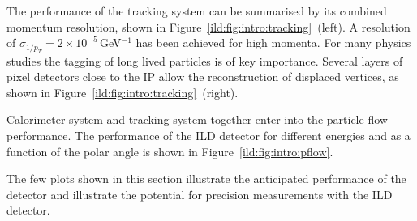The performance of the tracking system can be summarised by its combined momentum resolution, shown in Figure~\ref{ild:fig:intro:tracking}~(left). A resolution of $\sigma_{1/p_T} = 2 \times 10^{-5}$\,GeV$^{-1}$ has been achieved for high momenta. For many physics studies the tagging of long lived particles is of key importance. Several layers of pixel detectors close to the IP allow the reconstruction of displaced vertices, as shown in Figure~\ref{ild:fig:intro:tracking}~(right).




Calorimeter system and tracking system together enter into the particle flow performance. The performance of the ILD detector for different energies and as a function of the polar angle is shown in Figure~\ref{ild:fig:intro:pflow}. 

The few plots shown in this section illustrate the anticipated performance of the detector and illustrate the potential for precision measurements with the ILD detector. 
